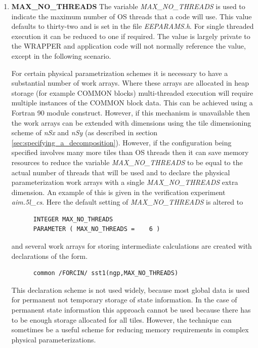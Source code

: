 \begin{enumerate}
\item {\bf MAX\_NO\_THREADS}
  The variable {\em MAX\_NO\_THREADS} is used to indicate the maximum
  number of OS threads that a code will use. This value defaults to
  thirty-two and is set in the file {\em EEPARAMS.h}.  For single
  threaded execution it can be reduced to one if required.  The value
  is largely private to the WRAPPER and application code will not
  normally reference the value, except in the following scenario.

  For certain physical parametrization schemes it is necessary to have
  a substantial number of work arrays. Where these arrays are
  allocated in heap storage (for example COMMON blocks) multi-threaded
  execution will require multiple instances of the COMMON block data.
  This can be achieved using a Fortran 90 module construct.  However,
  if this mechanism is unavailable then the work arrays can be extended
  with dimensions using the tile dimensioning scheme of {\em nSx} and
  {\em nSy} (as described in section
  \ref{sec:specifying_a_decomposition}). However, if the
  configuration being specified involves many more tiles than OS
  threads then it can save memory resources to reduce the variable
  {\em MAX\_NO\_THREADS} to be equal to the actual number of threads
  that will be used and to declare the physical parameterization work
  arrays with a single {\em MAX\_NO\_THREADS} extra dimension.  An
  example of this is given in the verification experiment {\em
    aim.5l\_cs}. Here the default setting of {\em MAX\_NO\_THREADS} is
  altered to
\begin{verbatim}
      INTEGER MAX_NO_THREADS
      PARAMETER ( MAX_NO_THREADS =    6 )
\end{verbatim}
  and several work arrays for storing intermediate calculations are
  created with declarations of the form.
\begin{verbatim}
      common /FORCIN/ sst1(ngp,MAX_NO_THREADS)
\end{verbatim}
  This declaration scheme is not used widely, because most global data
  is used for permanent not temporary storage of state information.
  In the case of permanent state information this approach cannot be
  used because there has to be enough storage allocated for all tiles.
  However, the technique can sometimes be a useful scheme for reducing
  memory requirements in complex physical parameterizations.
\end{enumerate}

